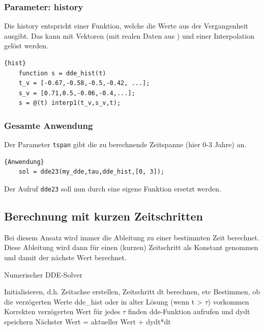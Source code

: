 \subsubsection{Parameter: history}
Die history entspricht einer Funktion, welche die Werte aus der Vergangenheit ausgibt. 
Das kann mit Vektoren (mit realen Daten aus \cite{NOAA:Daten}) und einer Interpolation gelöst werden.
\begin{lstlisting}[style=MATLAB]{hist}
	function s = dde_hist(t)
	t_v = [-0.67,-0.58,-0.5,-0.42, ...];
	s_v = [0.71,0.5,-0.06,-0.4,...];  
	s = @(t) interp1(t_v,s_v,t);
\end{lstlisting}

\subsubsection{Gesamte Anwendung}
Der Parameter \texttt{tspan} gibt die zu berechnende Zeitspanne (hier 0-3 Jahre) an.
\begin{lstlisting}[style=MATLAB]{Anwendung}
	sol = dde23(my_dde,tau,dde_hist,[0, 3]);
\end{lstlisting}
Der Aufruf \texttt{dde23} soll nun durch eine eigene Funktion ersetzt werden.
 

\subsection{Berechnung mit kurzen Zeitschritten}
Bei diesem Ansatz wird immer die Ableitung zu einer bestimmten Zeit berechnet.
Diese Ableitung wird dann für einen (kurzen) Zeitschritt als Konstant genommen und damit der nächste Wert berechnet.
\begin{algorithm}
	\caption{Numerischer DDE-Solver}
	\label{algo1}
	\begin{algorithmic}[1]
		\State Initialisieren, d.h. Zeitachse erstellen, Zeitschritt dt berechnen, etc
		\State Bestimmen, ob die verzögerten Werte dde\_hist oder in alter Lösung (wenn t > $\tau$) vorkommen
		\State Korrekten verzögerten Wert für jedes $\tau$ finden
		\EndFor
		\State dde-Funktion aufrufen und dydt speichern
		\State Nächster Wert = aktueller Wert + dydt*dt
		\EndFor
	\end{algorithmic}
\end{algorithm}

